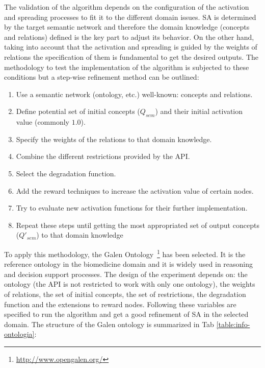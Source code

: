 The validation of the algorithm depends on the configuration of the activation and spreading processes to
fit it to the different domain issues. SA is determined by the target semantic network and therefore
the domain knowledge (concepts and relations) defined is the key part to adjust its behavior. On the other
hand, taking into account that the activation and spreading is guided by the weights of relations the specification
of them is fundamental to get the desired outputs. The methodology to test the implementation
of the algorithm is subjected to these conditions but a step-wise refinement method can be outlined:
\begin{enumerate}
  \item Use a semantic network (ontology, etc.) well-known: concepts and relations.
  \item Define potential set of initial concepts ($Q_{sem}$) and their initial activation value (commonly $1.0$).
  \item Specify the weights of the relations to that domain knowledge.
  \item Combine the different restrictions provided by the API.
  \item Select the degradation function.
  \item Add the reward techniques to increase the activation value of certain nodes.
  \item Try to evaluate new activation functions for their further implementation.
  \item Repeat these steps until getting the most appropriated set of output concepts ($Q'_{sem}$)
  to that domain knowledge
\end{enumerate}

To apply this methodology, the Galen Ontology~\footnote{\url{http://www.opengalen.org/}} has been selected. It is the reference ontology in the
biomedicine domain and it is widely used in reasoning and decision support processes. The design of
the experiment depends on: the ontology (the API is not restricted to work with only one ontology),
the weights of relations, the set of initial concepts, the set of restrictions, the degradation function and the extensions to reward nodes. Following these variables
are specified to run the algorithm and get a good refinement of SA in the selected domain. The structure of the Galen ontology 
is summarized in Tab \ref{table:info-ontologia}:

